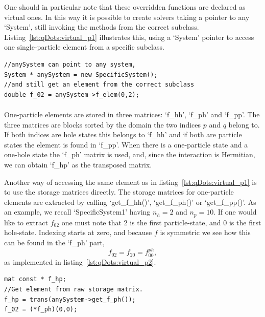One should in particular note that these overridden functions are declared as virtual ones. In this way it is possible to create solvers taking a pointer to any `System', still invoking the methods from the correct subclass. 
Listing~\ref{lst:qDots:virtual_p1} illustrates this, using a `System' pointer to access one single-particle element from a specific subclass.
\begin{lstlisting}[float,label={lst:qDots:virtual_p1},caption={A subclass has implemented the function `f\_elem()' returning the element $f_{02}$. The `System' base class has this method declared virtual, resulting in invoking the subclass implementation even when using a super-class pointer.},name={lst:qDots:virtual}]
//anySystem can point to any system,
System * anySystem = new SpecificSystem();
//and still get an element from the correct subclass
double f_02 = anySystem->f_elem(0,2);
\end{lstlisting}

\paragraph{}
One-particle elements are stored in three matrices: `f\_hh', `f\_ph' and `f\_pp'.
The three matrices are blocks sorted by the domain the two indices $p$ and $q$ belong to.
If both indices are hole states this belongs to `f\_hh' and if both are particle states the element is found in `f\_pp'.
When there is a one-particle state and a one-hole state the `f\_ph' matrix is used, and, since the interaction is Hermitian, we can obtain `f\_hp' as the transposed matrix.

Another way of accessing the same element as in listing~\ref{lst:qDots:virtual_p1} is to use the storage matrices directly. 
The storage matrices for one-particle elements are extracted by calling `get\_f\_hh()', `get\_f\_ph()' or `get\_f\_pp()'.
As an example, we recall `SpecificSystem1' having $n_h = 2$ and $n_p = 10$.
If one would like to extract $f_{02}$ one must note that $2$ is the first particle-state, and $0$ is the first hole-state. 
Indexing starts at zero, and because $f$ is symmetric we see how this can be found in the `f\_ph' part,
\begin{equation}
f_{02} = f_{20} = f^{ph}_{00},
\end{equation}
as implemented in listing~\ref{lst:qDots:virtual_p2}.
\begin{lstlisting}[float,label={lst:qDots:virtual_p2},caption={Continuing listing~\ref{lst:qDots:virtual_p1} extracting the same element, $f_{02}$, now through the raw storage matrix for $f$. This example assumes two occupied (hole) states, thus making index $2$ the first ($0$) particle state. With symmetric interaction matrices we expect $f_{ph} = f_{hp}^T$.},name={lst:qDots:virtual}]
mat const * f_hp;
//Get element from raw storage matrix.
f_hp = trans(anySystem->get_f_ph());
f_02 = (*f_ph)(0,0);
\end{lstlisting}

